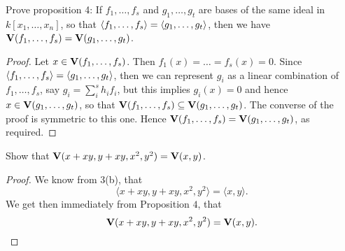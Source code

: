 \begin{exercise}{4}
Prove proposition 4: If $f_1,\dots,f_s$ and $g_1,\dots,g_t$ are bases of the same ideal in $k[x_1,\dots,x_n]$, so that $\langle f_1,\dots,f_s\rangle=\langle g_1,\dots,g_t\rangle$, then we have $\mathbf{V}(f_1,\dots,f_s)=\mathbf{V}(g_1,\dots,g_t)$.
\end{exercise}
\begin{proof}
Let $x\in \mathbf{V}(f_1,\dots,f_s)$. Then $f_1(x)=\dots=f_s(x)=0$. Since $\langle f_1,\dots,f_s\rangle=\langle g_1,\dots,g_t\rangle$, then we can represent $g_i$ as a linear combination of $f_1,\dots,f_s$, say $g_i=\sum_i^sh_if_i$, but this implies $g_i(x)=0$ and hence $x\in\mathbf{V}(g_1,\dots,g_t)$, so that $\mathbf{V}(f_1,\dots,f_s)\subseteq\mathbf{V}(g_1,\dots,g_t)$. The converse of the proof is symmetric to this one. Hence $\mathbf{V}(f_1,\dots,f_s)=\mathbf{V}(g_1,\dots,g_t)$, as required.
\end{proof}

\begin{exercise}{5}
    Show that $\mathbf{V}(x+xy,y+xy,x^2,y^2) = \mathbf{V}(x,y)$.
\end{exercise}
\begin{proof}
    We know from 3(b), that
    $$\langle x+xy, y+xy, x^2, y^2\rangle = \langle x,y\rangle.$$
    We get then immediately from Proposition $4$, that
    $$\mathbf{V}(x+xy,y+xy,x^2,y^2) = \mathbf{V}(x,y).$$
\end{proof}

